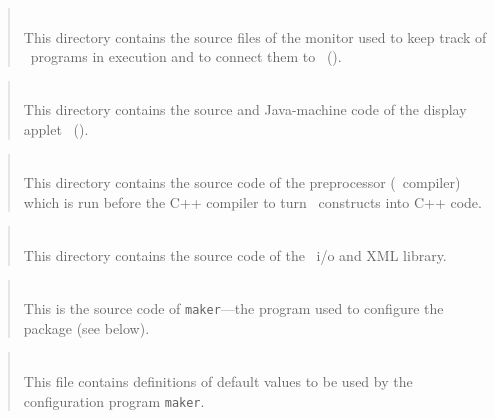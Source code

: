 \begin{quote}
\noindent{}\\ \hspace{0in}
This directory contains the source files of the monitor used to keep track
of \smurph\ programs in execution
and to connect them to \dsd\ ().
\end{quote}

\begin{quote}
\noindent{}\\ \hspace{0in}
This directory contains the source and Java-machine
code of the display applet \dsd\ ().
\end{quote}

\begin{quote}
\noindent{}\\ \hspace{0in}
This directory contains the source code of the preprocessor 
(\smurph\ compiler) which is run before the C++ compiler
to turn \smurph\ constructs into C++ code.
\end{quote}

\begin{quote}
\noindent{}\\ \hspace{0in}
This directory contains the source code of the \smurph\ 
i/o and XML library.
\end{quote}

\begin{quote}
\noindent{}\\ \hspace{0in}
This is the source code of {\tt maker}---the
program used to configure the package (see below).
\end{quote}

\begin{quote}
\noindent{}\\ \hspace{0in}
This file contains definitions of default values to be used by the
configuration program {\tt maker}.
\end{quote}

